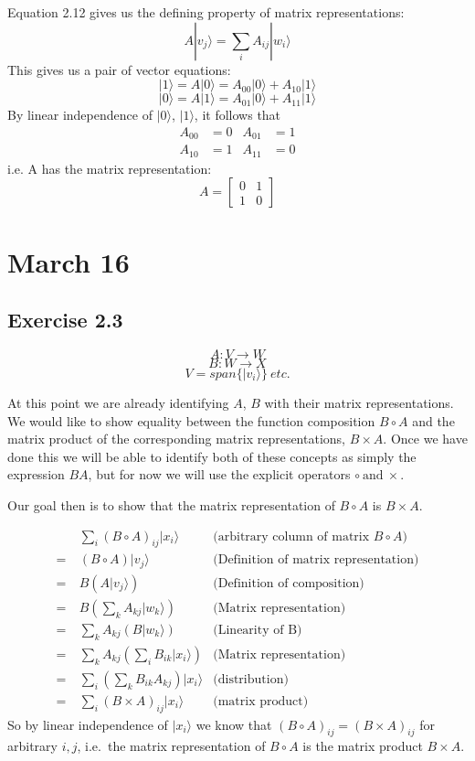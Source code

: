 \documentclass[]{article}
\newcommand{\ket}[1]{| #1 \rangle}
\begin{document}
Equation 2.12 gives us the defining property of matrix representations:
\[A\ket{v_j}=\sum_i A_{ij}\ket{w_i}\]
This gives us a pair of vector equations:
\[
	\ket{1} = A\ket{0} = A_{00}\ket{0} + A_{10}\ket{1}
\]
\[
	\ket{0} = A\ket{1} = A_{01}\ket{0} + A_{11}\ket{1}
\]
By linear independence of $\ket{0}$, $\ket{1}$, it follows that
\begin{align*}
A_{00} &= 0 & A_{01} &= 1 \\
A_{10} &= 1 & A_{11} &= 0
\end{align*}
i.e. A has the matrix representation:
\[
A = \left[\begin{matrix}
0 & 1 \\
1 & 0
\end{matrix}\right]
\]

\section{March 16}

\subsection{Exercise 2.3}
\[
A: V \to W
\]\[
B: W \to X
\]\[
	V = span\{\ket{v_i}\}\ \textit{etc.}
\]

At this point we are already identifying $A$, $B$ with their matrix representations. We would like to show equality between the function composition $B \circ A$ and the matrix product of the corresponding matrix representations, $B \times A$.
Once we have done this we will be able to identify both of these concepts as simply the expression $BA$, but for now we will use the explicit operators
$\circ\ \text{and}\ \times$.

Our goal then is to show that the matrix representation of $B \circ A$ is $B \times A$.

\begin{align*}
	&\sum_i {(B \circ A)}_{ij} \ket{x_i} &\text{(arbitrary column of matrix $B \circ A$)}\\
	=\ &(B \circ A)\ket{v_j} &\text{(Definition of matrix representation)}\\
	=\ &B(A\ket{v_j}) &\text{(Definition of composition)}\\
	=\ &B\left(\sum_k A_{kj} \ket{w_k}\right) &\text{(Matrix representation)}\\
	=\ &\sum_k A_{kj} (B \ket{w_k}) &\text{(Linearity of B)}\\
	=\ &\sum_k A_{kj} \left( \sum_i B_{ik} \ket{x_i} \right) &\text{(Matrix representation)}\\
	=\ &\sum_i \left(\sum_k B_{ik} A_{kj}\right) \ket{x_i} &\text{(distribution)}\\
	=\ &\sum_i {(B \times A)}_{ij} \ket{x_i} &\text{(matrix product)}
\end{align*}
So by linear independence of $\ket{x_i}$ we know that ${(B \circ A)}_{ij} = {(B \times A)}_{ij}$ for arbitrary $i, j$, i.e.\ the matrix representation of $B \circ A$ is the matrix product $B \times A$.
\end{document}
